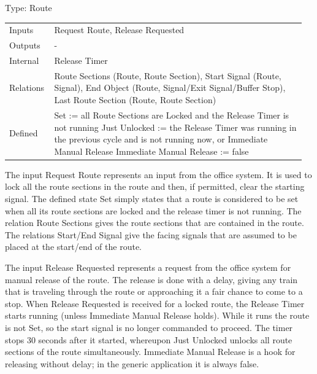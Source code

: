 \documentclass[10pt,a4paper]{article}
\makeatletter
\newcommand{\lab}[1]{\textcolor{Muted}{#1}}
\newenvironment{typerows}
  {\renewcommand{\arraystretch}{1.25}\small
   \begin{tabular}{@{}>{\raggedright\arraybackslash}p{0.14\linewidth}>{\raggedright\arraybackslash}p{0.82\linewidth}@{}}}
  {\end{tabular}}
\newcommand{\para}[1]{\par\vspace{1mm}#1\par\vspace{2mm}}
\makeatother
\begin{document}
\begin{typecard}{Type: Route}
\begin{typerows}
\lab{Inputs} & Request Route, Release Requested \\
\lab{Outputs} & - \\
\lab{Internal} & Release Timer \\
\lab{Relations} & Route Sections (Route, Route Section), Start Signal (Route, Signal), End Object (Route, Signal/Exit Signal/Buffer Stop), Last Route Section (Route, Route Section) \\
\lab{Defined} & Set := all Route Sections are Locked and the Release Timer is not running \newline
Just Unlocked := the Release Timer was running in the previous cycle and is not running now, or Immediate Manual Release \newline
Immediate Manual Release := false \\
\end{typerows}
\end{typecard}
The input Request Route represents an input from the office system. It is used to lock all the route sections in the route and then, if permitted, clear the starting signal. The defined state Set simply states that a route is considered to be set when all its route sections are locked and the release timer is not running. The relation Route Sections gives the route sections that are contained in the route. The relations Start/End Signal give the facing signals that are assumed to be placed at the start/end of the route.

\para{The input Release Requested represents a request from the office system for manual release of the route. The release is done with a delay, giving any train that is traveling through the route or approaching it a fair chance to come to a stop. When Release Requested is received for a locked route, the Release Timer starts running (unless Immediate Manual Release holds). While it runs the route is not Set, so the start signal is no longer commanded to proceed. The timer stops 30 seconds after it started, whereupon Just Unlocked unlocks all route sections of the route simultaneously. Immediate Manual Release is a hook for releasing without delay; in the generic application it is always false.}
\end{document}
